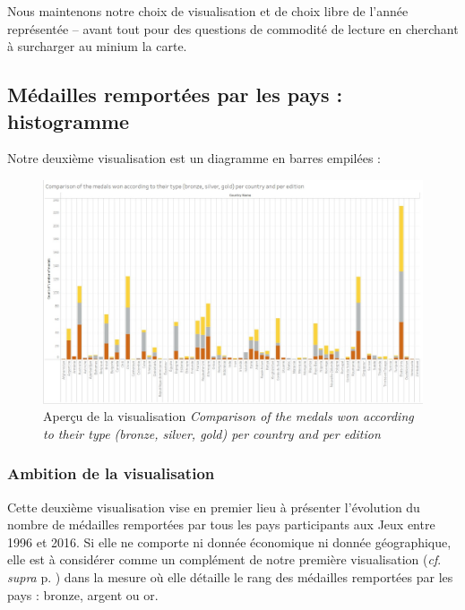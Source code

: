 \documentclass[hidelinks, 12pt]{report}
\begin{document}
Nous maintenons notre choix de visualisation et de choix libre de l'année représentée -- avant tout pour des questions de commodité de lecture en cherchant à surcharger au minium la carte.





%





\subsection{Médailles remportées par les pays : histogramme}

Notre deuxième visualisation est un diagramme en barres empilées :

\begin{center}
	\begin{figure}[H]
		\setlength{\belowcaptionskip}{-35pt}
		\includegraphics[scale=0.3]{images/datavis-medals-world-histo.jpeg}
		\captionsetup{justification=centering}
		\caption{Aperçu de la visualisation \textit{Comparison of the medals won according to their type (bronze, silver, gold) per country and per edition}}
	\end{figure}
\end{center}

\subsubsection{Ambition de la visualisation}

Cette deuxième visualisation vise en premier lieu à présenter l'évolution du nombre de médailles remportées par tous les pays participants aux Jeux entre 1996 et 2016. Si elle ne comporte ni donnée économique ni donnée géographique, elle est à considérer comme un complément de notre première visualisation (\textit{cf}. \textit{supra} p. \pageref{map}) dans la mesure où elle détaille le rang des médailles remportées par les pays : bronze, argent ou or.
\end{document}
